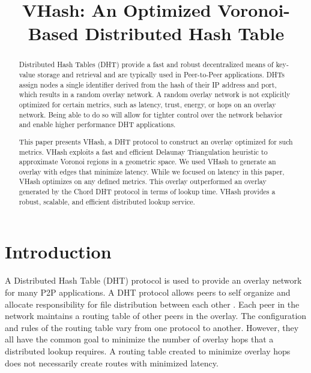 \documentclass[10pt, conference, letterpaper]{IEEEtran}
\title{VHash: An Optimized Voronoi-Based Distributed Hash Table }
\date{} %
\begin{document}
\maketitle

\begin{abstract}
Distributed Hash Tables (DHT) provide a fast and robust decentralized means of key-value storage and retrieval and are typically used in Peer-to-Peer applications.
DHTs assign nodes a single identifier derived from the hash of their IP address and port, which results in a random overlay network.   
A random overlay network is not explicitly optimized for certain metrics, such as latency, trust, energy, or hops on an overlay network. 
Being able to do so will allow for tighter control over the network behavior and enable higher performance DHT applications.

This paper presents VHash, a DHT protocol to construct an overlay optimized for such metrics. 
VHash exploits a fast and efficient Delaunay Triangulation heuristic to approximate Voronoi regions in a geometric space. 
We used VHash to generate an overlay with edges that minimize latency. 
While we focused on latency in this paper, VHash optimizes on any defined metrics.
This overlay outperformed an overlay generated by the Chord DHT protocol in terms of lookup time.
VHash provides a robust, scalable, and efficient distributed lookup service.

\end{abstract}

\section{Introduction}
A Distributed Hash Table (DHT) protocol is used to provide an overlay network for many P2P applications. 
A DHT protocol allows peers to self organize and allocate responsibility for file distribution between each other \cite{bittorrent} \cite{kademlia} \cite{chord} \cite{pastry}.
Each peer in the network maintains a routing table of other peers in the overlay.
The configuration and rules of the routing table vary from one protocol to another.
However, they all have the common goal to minimize the number of overlay hops that a distributed lookup requires.
A routing table created to minimize overlay hops does not necessarily create routes with minimized latency.
\end{document}
